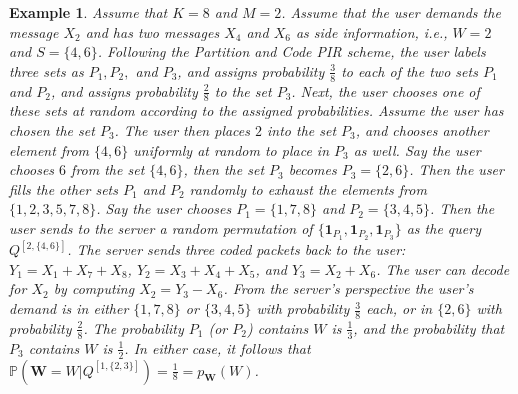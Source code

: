 \documentclass[letterpaper, 10 pt, conference]{ieeeconf}
\newtheorem{example}{Example}
\begin{document}
\begin{example}
Assume that $K=8$ and $M=2$. Assume that the user demands the message $X_2$ and has two messages $X_4$ and $X_6$ as side information, i.e., $W=2$ and $S=\{4,6\}$. Following the Partition and Code PIR scheme, the user labels three sets as $P_1,P_2,$ and $P_3$, and assigns probability $\frac{3}{8}$ to each of the two sets $P_1$ and $P_2$, and assigns probability $\frac{2}{8}$ to the set $P_3$. Next, the user chooses one of these sets at random according to the assigned probabilities. Assume the user has chosen the set $P_3$. The user then places $2$ into the set $P_3$, and chooses another element from $\{4,6\}$ uniformly at random to place in $P_3$ as well. Say the user chooses $6$ from the set $\{4,6\}$, then the set $P_3$ becomes $P_3 = \{2,6\}$. Then the user fills the other sets $P_1$ and $P_2$ randomly to exhaust the elements from $\{1,2,3,5,7,8\}$. Say the user chooses $P_1 = \{1,7,8\}$ and $P_2 = \{3,4,5\}$. Then the user sends to the server a random permutation of $\{\mathbf{1}_{P_1},\mathbf{1}_{P_2},\mathbf{1}_{P_3}\}$ as the query $Q^{[2,\{4,6\}]}$. The server sends three coded packets back to the user: $Y_1 = X_1 + X_7 + X_8$, $Y_2 = X_3 + X_4 + X_5$, and $Y_3 = X_2 + X_6$. The user can decode for $X_2$ by computing $X_2 = Y_3 - X_6$. From the server's perspective the user's demand is in either $\{1,7,8\}$ or $\{3,4,5\}$ with probability $\frac{3}{8}$ each, or in $\{2,6\}$ with probability $\frac{2}{8}$. The probability $P_1$ (or $P_2$) contains $W$ is $\frac{1}{3}$, and the probability that $P_3$ contains $W$ is $\frac{1}{2}$. In either case, it follows that $\mathbb{P}(\mathbf{W}=W|Q^{[1,\{2,3\}]})=\frac{1}{8}=p_{\mathbf{W}}(W)$. 
\end{example}
\end{document}

